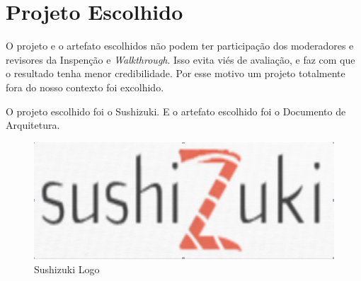 \chapter{Projeto Escolhido}

O projeto e o artefato escolhidos não podem ter participação dos moderadores e revisores da Inspenção e \textit{Walkthrough}.
Isso evita viés de avaliação, e faz com que o resultado tenha menor credibilidade. Por esse motivo um projeto totalmente fora 
do nosso contexto foi excolhido.

O projeto escolhido foi o Sushizuki.
E o artefato escolhido foi o Documento de Arquitetura.


\begin{figure}[H]
  \center
  \includegraphics[width=1\textwidth]{figuras/sushizuki.png}
  \caption{Sushizuki Logo}
  \label{fig:sushizuki}
\end{figure}

